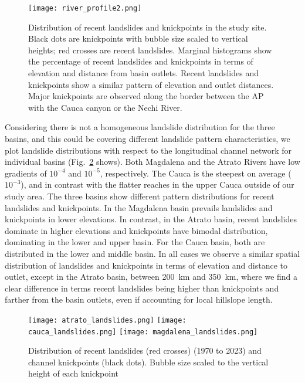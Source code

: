 \documentclass[draft]{agujournal2019}
\begin{document}
\begin{figure}[ht!]
     \centering
        {\texttt{[image: river\_profile2.png]}}
    \caption{Distribution of recent landslides and knickpoints in the study site. Black dots are knickpoints with bubble size scaled to vertical heights; red crosses are recent landslides. Marginal histograms show the percentage of recent landslides and knickpoints in terms of elevation and distance from basin outlets. Recent landslides and knickpoints show a similar pattern of elevation and outlet distances. Major knickpoints are observed along the border between the AP with the Cauca canyon or the Nechi River.}
  \label{fig:profiles}
\end{figure}

\par Considering there is not a homogeneous landslide distribution for the three basins, and this could be covering different landslide pattern characteristics, we plot landslide distributions with respect to the longitudinal channel network for individual basins (Fig.~\ref{fig:elevationKnickpoints} shows). Both Magdalena and the Atrato Rivers have low gradients of $10^{-4}$ and $10^{-5}$, respectively. The Cauca is the steepest on average ($10^{-3}$), and in contrast with the flatter reaches in the upper Cauca outside of our study area. The three basins show different pattern distributions for recent landslides and knickpoints. In the Magdalena basin prevails landslides and knickpoints in lower elevations. In contrast, in the Atrato basin, recent landslides dominate in higher elevations and knickpoints have bimodal distribution, dominating in the lower and upper basin. For the Cauca basin, both are distributed in the lower and middle basin. In all cases we observe a similar spatial distribution of landslides and knickpoints in terms of elevation and distance to outlet, except in the Atrato basin, between 200~km and 350~km, where we find a clear difference in terms recent landslides being higher than knickpoints and farther from the basin outlets, even if accounting for local hillslope length. 

\begin{figure}[ht!]
    \centering
      {\texttt{[image: atrato\_landslides.png]}}
      {\texttt{[image: cauca\_landslides.png]}}
      {\texttt{[image: magdalena\_landslides.png]}}
    \caption{Distribution of recent landslides (red crosses) (1970 to 2023) and channel knickpoints (black dots). Bubble size scaled to the vertical height of each knickpoint}
    \label{fig:elevationKnickpoints}
\end{figure}
\end{document}
